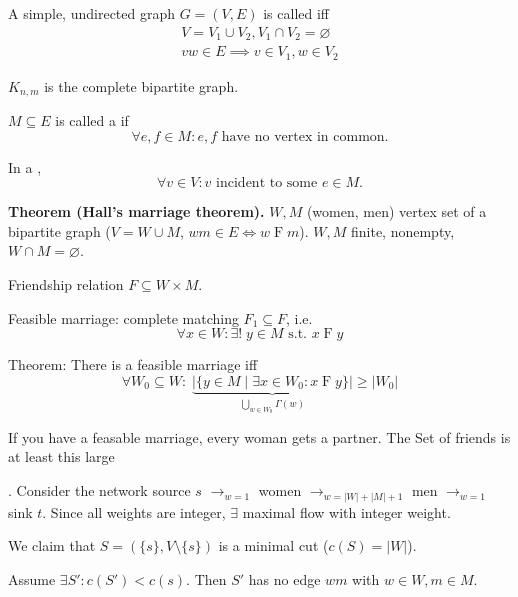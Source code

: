 \begin{definition}
A simple, undirected graph $G=(V,E)$ is called 
iff
\begin{align*}
    V = V_1\cup V_2, V_1\cap V_2 = \varnothing \\
    vw\in E\implies v\in V_1, w\in V_2
\end{align*}
\end{definition}

$K_{n,m}$ is the complete bipartite graph.

\begin{definition}
$M\subseteq E$ is called a  if
\[
    \forall e,f\in M: e,f\text{ have no vertex in common.}
\]
\end{definition}
\begin{definition}
In a ,
\[
    \forall v\in V: v\text{ incident to some }e\in M.
\]
\end{definition}




\textbf{Theorem (Hall's marriage theorem).}
$W, M$ (women, men) vertex set of a bipartite graph
($V=W\cup M$, $wm \in E \iff w\operatorname{F}m$). $W,M$ finite, nonempty, $W\cap M=\varnothing$.

Friendship relation $F\subseteq W\times M$.

Feasible marriage: complete matching $F_1\subseteq F$, i.e.
\[ \forall x\in W: \exists!\;y\in M\text{ s.t. }x\operatorname{F} y \]

Theorem: There is a feasible marriage iff
\[
    \forall W_0\subseteq W:\;
        \underbrace{
            |\{y\in M\mid \exists x\in W_0: x\operatorname{F} y\}|
        }_{\bigcup\limits_{w\in W_0} \Gamma(w)}
        ≥ |W_0|
\]

If you have a feasable marriage, every woman gets a partner.
The Set of friends is at least this large

\Proof.
Consider the network source $s$ $\rightarrow_{w=1}$ women $\rightarrow_{w=|W|+|M|+1}$ men $\rightarrow_{w=1}$ sink $t$.
Since all weights are integer, $\exists$ maximal flow with integer weight.



We claim that $S=(\{s\}, V \setminus \{s\})$
is a minimal cut ($c(S) = |W|$).

Assume $\exists S': c(S') < c(s)$. Then $S'$ has no edge $wm$ with $w\in W, m\in M$.

